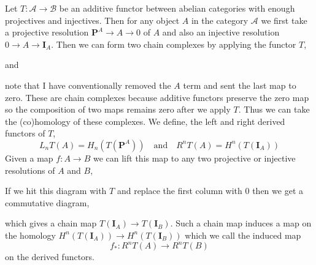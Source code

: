 \documentclass[12pt]{article}
\newcommand{\A}{\mathcal{A}}
\theoremstyle{remark}
\theoremstyle{definition}
\newenvironment{definition}[1][Definition:]{\begin{trivlist}
\item[\hskip \labelsep {\bfseries #1}]}{\end{trivlist}}
\begin{document}
\begin{definition}
Let $T : \mathcal{A} \to \mathcal{B}$ be an additive functor between abelian categories with enough projectives and injectives. Then for any object $A$ in the category $\A$ we first take a projective resolution $\mathbf{P}^A \to A \to 0$ of $A$ and also an injective resolution $0 \to A \to \mathbf{I}_A$. Then we can form two chain complexes by applying the functor $T$,
\begin{center}
\end{center} 
\begin{center}
and
\end{center} 
\begin{center}
\end{center} 
note that I have conventionally removed the $A$ term and sent the last map to zero.
These are chain complexes because additive functors preserve the zero map so the composition of two maps remains zero after we apply $T$. Thus we can take the (co)homology of these complexes. We define, the left and right derived functors of $T$,
\[ L_n T(A) = H_n(T(\mathbf{P}^A)) \quad \text{and} \quad R^n T(A) = H^n(T(\mathbf{I}_A)) \]
Given a map $f : A \to B$ we can lift this map to any two projective or injective resolutions of $A$ and $B$,
\begin{center}
\end{center}
If we hit this diagram with $T$ and replace the first column with $0$ then we get a commutative diagram,
\begin{center}
\end{center}
which gives a chain map $T(\mathbf{I}_A) \to T(\mathbf{I}_B)$. Such a chain map induces a map on the homology $H^n(T(\mathbf{I}_A)) \to H^n(T(\mathbf{I}_B))$ which we call the induced map
\[ f_* : R^n T(A) \to R^n T(B) \]
on the derived functors. 
\end{definition}
\end{document}
